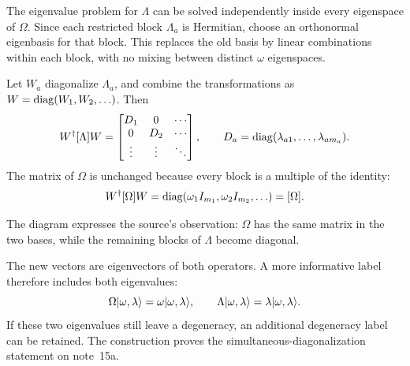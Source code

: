 The eigenvalue problem for $\Lambda$ can be solved independently
inside every eigenspace of $\Omega$. Since each restricted block
$\Lambda_a$ is Hermitian, choose an orthonormal eigenbasis for that
block. This replaces the old basis by linear combinations within
each block, with no mixing between distinct $\omega$ eigenspaces.

Let $W_a$ diagonalize $\Lambda_a$, and combine the transformations as
$W=\operatorname{diag}(W_1,W_2,\ldots)$. Then
\[
 W^\dagger[\Lambda]W=
 \begin{bmatrix}
 D_1&0&\cdots\\0&D_2&\cdots\\\vdots&\vdots&\ddots
 \end{bmatrix},\qquad
 D_a=\operatorname{diag}(\lambda_{a1},\ldots,\lambda_{am_a}).
\]
The matrix of $\Omega$ is unchanged because every block is a multiple
of the identity:
\[
 W^\dagger[\Omega]W
 =\operatorname{diag}(\omega_1 I_{m_1},\omega_2 I_{m_2},\ldots)=[\Omega].
\]
\begin{center}
\end{center}
The diagram expresses the source's observation: $\Omega$ has the same
matrix in the two bases, while the remaining blocks of $\Lambda$
become diagonal.

The new vectors are eigenvectors of both operators. A more informative
label therefore includes both eigenvalues:
\[
 \Omega\lvert \omega,\lambda\rangle=\omega\lvert \omega,\lambda\rangle,
 \qquad
 \Lambda\lvert \omega,\lambda\rangle=\lambda\lvert \omega,\lambda\rangle.
\]
If these two eigenvalues still leave a degeneracy, an additional
degeneracy label can be retained. The construction proves the
simultaneous-diagonalization statement on note~15a.

